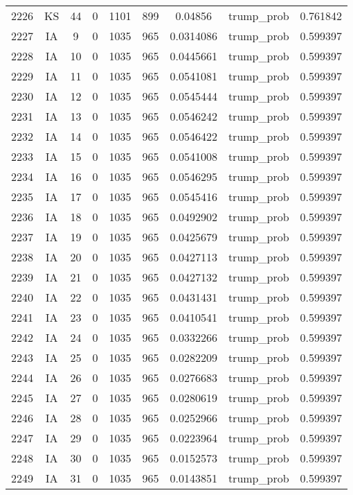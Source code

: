 \documentclass[12pt,a4paper]{article}
\begin{document}
\begin{tabular}{r|cccccccc}
	2226 & KS & 44 & 0 & 1101 & 899 & 0.04856 & trump\_prob & 0.761842 \\
	2227 & IA & 9 & 0 & 1035 & 965 & 0.0314086 & trump\_prob & 0.599397 \\
	2228 & IA & 10 & 0 & 1035 & 965 & 0.0445661 & trump\_prob & 0.599397 \\
	2229 & IA & 11 & 0 & 1035 & 965 & 0.0541081 & trump\_prob & 0.599397 \\
	2230 & IA & 12 & 0 & 1035 & 965 & 0.0545444 & trump\_prob & 0.599397 \\
	2231 & IA & 13 & 0 & 1035 & 965 & 0.0546242 & trump\_prob & 0.599397 \\
	2232 & IA & 14 & 0 & 1035 & 965 & 0.0546422 & trump\_prob & 0.599397 \\
	2233 & IA & 15 & 0 & 1035 & 965 & 0.0541008 & trump\_prob & 0.599397 \\
	2234 & IA & 16 & 0 & 1035 & 965 & 0.0546295 & trump\_prob & 0.599397 \\
	2235 & IA & 17 & 0 & 1035 & 965 & 0.0545416 & trump\_prob & 0.599397 \\
	2236 & IA & 18 & 0 & 1035 & 965 & 0.0492902 & trump\_prob & 0.599397 \\
	2237 & IA & 19 & 0 & 1035 & 965 & 0.0425679 & trump\_prob & 0.599397 \\
	2238 & IA & 20 & 0 & 1035 & 965 & 0.0427113 & trump\_prob & 0.599397 \\
	2239 & IA & 21 & 0 & 1035 & 965 & 0.0427132 & trump\_prob & 0.599397 \\
	2240 & IA & 22 & 0 & 1035 & 965 & 0.0431431 & trump\_prob & 0.599397 \\
	2241 & IA & 23 & 0 & 1035 & 965 & 0.0410541 & trump\_prob & 0.599397 \\
	2242 & IA & 24 & 0 & 1035 & 965 & 0.0332266 & trump\_prob & 0.599397 \\
	2243 & IA & 25 & 0 & 1035 & 965 & 0.0282209 & trump\_prob & 0.599397 \\
	2244 & IA & 26 & 0 & 1035 & 965 & 0.0276683 & trump\_prob & 0.599397 \\
	2245 & IA & 27 & 0 & 1035 & 965 & 0.0280619 & trump\_prob & 0.599397 \\
	2246 & IA & 28 & 0 & 1035 & 965 & 0.0252966 & trump\_prob & 0.599397 \\
	2247 & IA & 29 & 0 & 1035 & 965 & 0.0223964 & trump\_prob & 0.599397 \\
	2248 & IA & 30 & 0 & 1035 & 965 & 0.0152573 & trump\_prob & 0.599397 \\
	2249 & IA & 31 & 0 & 1035 & 965 & 0.0143851 & trump\_prob & 0.599397 \\

\end{tabular}
\end{document}
